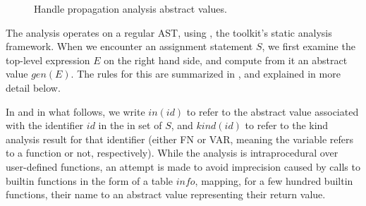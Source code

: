 \begin{figure}
\centering
{}
\caption{Handle propagation analysis abstract values.}
\label{fig:HandleLattice}
\end{figure}


The analysis operates on a regular \matlab AST, using \mcsaf, the \mclab
toolkit's static analysis framework. When we encounter an assignment statement
$S$, we first examine the top-level expression $E$ on the right hand side, and
compute from it an abstract value $gen(E)$. The rules for this are summarized in
, and explained in more detail below.

In  and in what follows, we write $in(id)$ to
refer to the abstract value associated with the identifier $id$ in the in set
of $S$, and $kind(id)$ to refer to the kind analysis result for that identifier
(either FN or VAR, meaning the variable refers to a function or not,
respectively). While the analysis is intraprocedural over user-defined
functions, an attempt is made to avoid imprecision caused by calls to builtin
functions in the form of a table $info$, mapping, for a few hundred builtin
functions, their name to an abstract value representing their return value.

